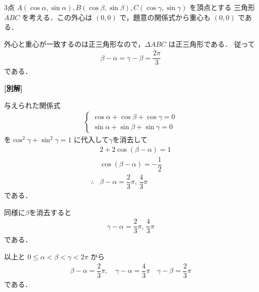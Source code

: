 \documentclass[../../main.tex]{subfiles}
\begin{document}
3点 $A(\cos\alpha, \sin\alpha), B(\cos\beta, \sin\beta), C(\cos\gamma, \sin\gamma)$ を頂点とする 三角形$ABC$ を考える．この外心は $(0,0)$ で，題意の関係式から重心も $(0,0)$ である．

外心と重心が一致するのは正三角形なので，$\Delta ABC$ は正三角形である．
従って
\begin{align}
  \beta - \alpha = \gamma - \beta = \dfrac{2\pi}{3}
\end{align}
である．

{\bf [別解]}

与えられた関係式
\begin{align}
  \begin{cases}
    \cos\alpha+\cos\beta+\cos\gamma=0 \\
    \sin\alpha+\sin\beta+\sin\gamma=0
  \end{cases}
\end{align}
を$\cos^2\gamma + \sin^2\gamma = 1$ に代入して$\gamma$を消去して
\begin{align}
  & 2 + 2\cos(\beta - \alpha) = 1 \\
  & \cos(\beta - \alpha) = -\dfrac{1}{2} \\
  \therefore
  &\beta - \alpha = \dfrac{2}{3}\pi, \, \dfrac{4}{3}\pi
\end{align}
である．

同様に$\beta$を消去すると
\begin{align}
  \gamma - \alpha = \dfrac{2}{3}\pi, \, \dfrac{4}{3}\pi
\end{align}
である．

以上と $0 \le \alpha < \beta < \gamma < 2\pi$ から
\begin{align}
  \beta - \alpha = \dfrac{2}{3}\pi,
  \quad
  \gamma - \alpha = \dfrac{4}{3}\pi
  \quad
  \gamma - \beta = \dfrac{2}{3}\pi
\end{align}
である．

\newpage
\end{document}
